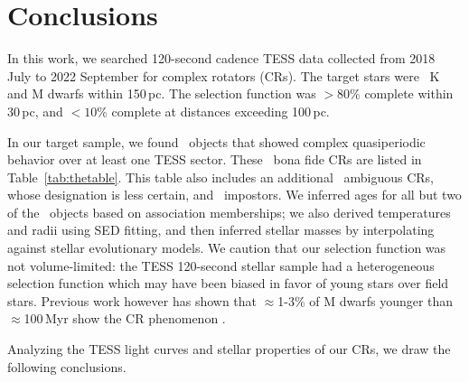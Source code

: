 \documentclass[11pt,twocolumn,tighten]{aastex63}
\begin{document}
\section{Conclusions}
\label{sec:conclusion}

In this work, we searched 120-second cadence TESS data collected from
2018 July to 2022 September for complex rotators
(CRs).  The target stars were \nstarssearched\ K and M dwarfs within
150\,pc.  The selection function was $>$$80\%$ complete within 30\,pc,
and $<$$10\%$ complete at distances exceeding 100\,pc.

In our target sample, we found \ngoods\ objects that showed complex
quasiperiodic behavior over at least one TESS sector.  These \ngoods\
bona fide CRs are listed in Table~\ref{tab:thetable}.  This table also
includes an additional \nmaybes\ ambiguous CRs, whose designation is
less certain, and \ndebunked\ impostors.  We inferred ages for all but
two of the \nallcands\ objects based on association memberships; we
also derived temperatures and radii using SED fitting, and then
inferred stellar masses by interpolating against stellar evolutionary
models.  We caution that our selection function was not
volume-limited: the TESS 120-second stellar sample had a heterogeneous
selection function which may have been biased in favor of young stars
over field stars.  Previous work however has shown that $\approx$1-3\%
of M dwarfs younger than $\approx$100\,Myr show the CR phenomenon
\citep{2016AJ....152..114R,2022AJ....163..144G}.

Analyzing the TESS light curves and stellar properties of our CRs, we
draw the following conclusions.
\end{document}
